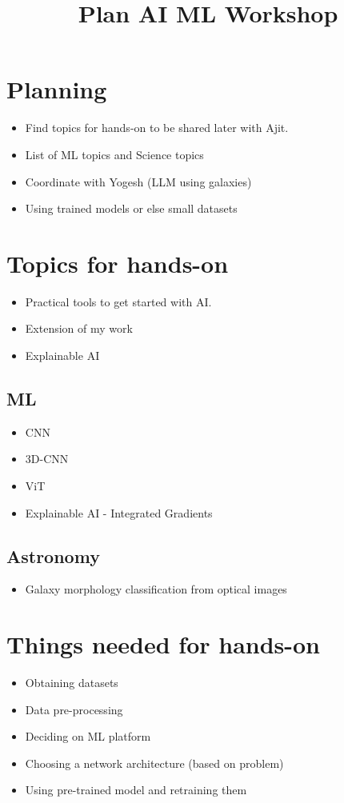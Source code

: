 \documentclass{../template/texnote}
\title{Plan AI ML Workshop}
\begin{document}
    \maketitle {}
	\section{Planning}
	\begin{itemize}
		\item Find topics for hands-on to be shared later with Ajit.
		\item List of ML topics and Science topics
		\item Coordinate with Yogesh (LLM using galaxies)
		\item Using trained models or else small datasets
	\end{itemize}
\section{Topics for hands-on}
	\begin{itemize}
		\item Practical tools to get started with AI.
		\item Extension of my work
		\item Explainable AI
	\end{itemize}
	\subsection{ML}
		\begin{itemize}
			\item CNN
			\item 3D-CNN
			\item ViT
			\item Explainable AI - Integrated Gradients
		\end{itemize}
	\subsection{Astronomy}
		\begin{itemize}
			\item Galaxy morphology classification from optical images
		\end{itemize}
\section{Things needed for hands-on}
	\begin{itemize}
		\item Obtaining datasets
		\item Data pre-processing
		\item Deciding on ML platform
		\item Choosing a network architecture (based on problem)
		\item Using pre-trained model and retraining them
	\end{itemize}
    \printbibliography
\end{document}
